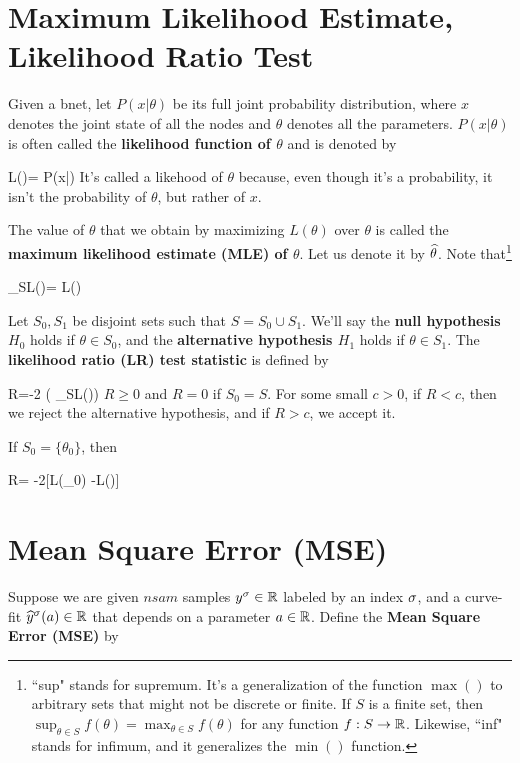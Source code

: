 \section{Maximum Likelihood Estimate,
Likelihood Ratio Test}
\label{sec-likelihood-ratio}

Given a bnet, let $P(x|\theta)$
be its full joint probability distribution,
where
$x$ denotes the joint state
of all the nodes and $\theta$
denotes all the parameters.
 $P(x|\theta)$ is often
called the {\bf likelihood function of $\theta$}
and is denoted by

\beq
L(\theta)= P(x|\theta)
\eeq
It's called a likehood of $\theta$
because, even though it's a probability,
it isn't the probability of $\theta$,
but rather of $x$.

The value of $\theta$
that we obtain by maximizing $L(\theta)$
over $\theta$ is called
the
{\bf maximum likelihood
estimate (MLE) of $\theta$}. Let us denote it by
${\widehat{\theta}}$. Note that\footnote{``sup" stands for supremum.
It's a generalization of the function $\max()$
to arbitrary sets
that might not be discrete or finite.
If $S$ is a
finite set,
then $\sup_{\theta\in S} f(\theta)=
\max_{\theta\in S} f(\theta)$
for any function $f:S\rightarrow { \mathbb{R}}$.
Likewise, ``inf" stands for infimum,
and it generalizes the $\min()$ function.}

\beq
\sup_{\theta\in S}L(\theta)=
L(\HAT{\theta})
\eeq


Let $S_0, S_1$ be disjoint sets such that
 $S=S_0\cup S_1$.
We'll say
the {\bf null hypothesis $H_0$} holds
 if $\theta\in S_0$,
and the {\bf alternative hypothesis $H_1$}
holds if
$\theta\in S_1$.
The {\bf likelihood ratio (LR) test statistic}
is defined by


\beq
R=-2\ln
\left(
{\sup_{\theta\in S}L(\theta)}\right)
\eeq
$R\geq 0$ and $R=0$ if  $S_0=S$.
For some small $c>0$,
if $R<c$, then we reject the alternative hypothesis,
and if $R>c$, we accept it.




If $S_0=\{\theta_0\}$,
then

\beq
R= -2[\ln L(\theta_0) -\ln L(\HAT{\theta})]
\eeq


\section{Mean Square Error (MSE)}

Suppose we are
given $nsam$ samples $y^\sigma\in{ \mathbb{R}}$
labeled by an index $\sigma$,
and a curve-fit ${\widehat{y}}^\sigma(a)\in{ \mathbb{R}}$
that depends on a parameter $a\in{ \mathbb{R}}$.
Define the {\bf Mean Square
Error (MSE)}
by

